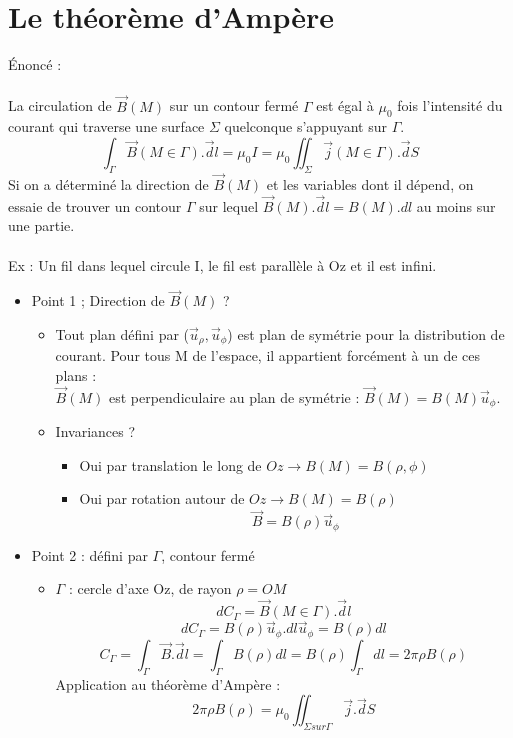 \documentclass[11pt,a4paper,french]{article}
\begin{document}
\section{Le théorème d'Ampère}
Énoncé : \\ \\
La circulation  de $\vec B(M)$ sur un contour fermé $\Gamma$ est égal à $\mu_0$ fois l'intensité du courant qui traverse une surface $\Sigma$ quelconque s'appuyant sur $\Gamma$.
$$\int_\Gamma \vec B(M \in \Gamma).\vec dl = \mu_0 I = \mu_0 \iint_\Sigma \vec j(M \in \Gamma).\vec dS$$
Si on a déterminé la direction de $\vec B(M)$ et les variables dont il dépend, on essaie de trouver un contour $\Gamma$ sur lequel $\vec B(M).\vec dl = B(M).dl$ au moins sur une partie. \\ \\
Ex : Un fil dans lequel circule I, le fil est parallèle à Oz et il est infini.
\begin{itemize}
\item Point 1 ; Direction de $\vec B(M)$ ?
\begin{itemize}
\item Tout plan défini par ($\vec u_\rho, \vec u_\phi$) est plan de symétrie pour la distribution de courant. Pour tous M de l'espace,  il appartient forcément à un de ces plans : \\
$\vec B(M)$ est perpendiculaire au plan de symétrie : $\vec B(M) = B(M) \vec u_\phi$.
\item Invariances ?
\begin{itemize}
\item Oui par translation le long de $Oz \rightarrow B(M) = B(\rho, \phi)$
\item Oui par rotation autour de $Oz \rightarrow B(M) = B(\rho)$
$$\vec B = B(\rho)\vec u_\phi$$
\end{itemize}
\end{itemize}
\item Point 2 : défini par $\Gamma$, contour fermé
\begin{itemize}
\item $\Gamma$ : cercle d'axe Oz, de rayon $\rho = OM$
$$dC_\Gamma = \vec B(M \in \Gamma).\vec dl$$
$$dC_\Gamma = B(\rho)\vec u_\phi . dl \vec u_\phi = B(\rho)dl$$
$$C_\Gamma = \int_\Gamma \vec B.\vec dl = \int_\Gamma B(\rho)dl = B(\rho)\int_\Gamma dl = 2\pi \rho B(\rho)$$
Application au théorème d'Ampère : 
$$2\pi\rho B(\rho)=\mu_0 \iint_{\Sigma sur \Gamma}\vec j . \vec dS$$
\end{itemize}
\end{itemize}
\end{document}
